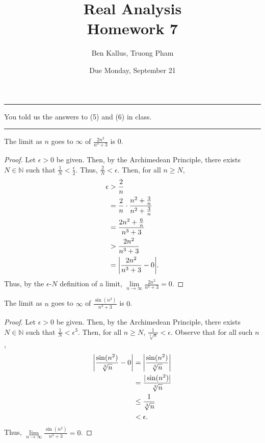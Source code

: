 \documentclass[12pt]{article}
\title{Real Analysis \\ Homework 7}
\author{Ben Kallus, Truong Pham}
\date{Due Monday, September 21}
\begin{document}
\maketitle

\hrule
\bigskip

 You told us the answers to (5) and (6) in class.

\bigskip
\hrule
\bigskip

 The limit as $n$ goes to $\infty$ of $\frac{2n^2}{n^3+3}$ is $0$.
\begin{proof}
    Let $\epsilon > 0$ be given. Then, by the Archimedean Principle, there exists $N \in \mathbb N$ such that $\frac1N < \frac\epsilon2$. Thus, $\frac2N < \epsilon$. Then, for all $n \geq N$,
    \begin{align*}
        \epsilon &> \frac2n \\
                 &= \frac2n \cdot \frac{n^2+\frac3n}{n^2+\frac3n} \\
                 &= \frac{2n^2+\frac6n}{n^3+3} \\
                 &> \frac{2n^2}{n^3+3} \\
                 &= \bigg{|} \frac{2n^2}{n^3+3} - 0 \bigg{|}.
    \end{align*}
    Thus, by the $\epsilon$-$N$ definition of a limit, $\lim\limits_{n\to\infty}\frac{2n^2}{n^3+3} = 0$.
\end{proof}

\newpage
{} The limit as $n$ goes to $\infty$ of $\frac{\sin(n^2)}{n^3+3}$ is $0$.
\begin{proof}
    Let $\epsilon > 0$ be given. Then, by the Archimedean Principle, there exists $N \in \mathbb N$ such that $\frac1N < \epsilon^3$. Then, for all $n \geq N$, $\frac1{\sqrt[3]n} < \epsilon$. Observe that for all such $n$,
    \begin{align*}
        \bigg{|} \frac{\sin(n^2)}{\sqrt[3]n} - 0\bigg{|} &= \bigg{|} \frac{\sin(n^2)}{\sqrt[3]n} \bigg{|} \\
        &= \frac{|\sin(n^2)|}{\sqrt[3]n} \\
        &\leq \frac1{\sqrt[3] n} \\
        &< \epsilon.
    \end{align*}
    Thus, $\lim\limits_{n\to\infty}\frac{\sin(n^2)}{n^3+3} = 0$.
\end{proof}
\end{document}
